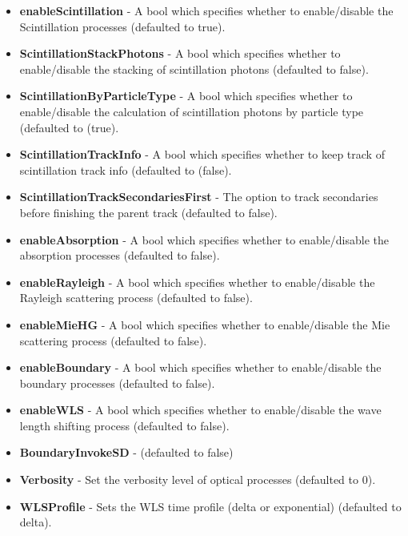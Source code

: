 \documentclass[8pt]{refart}
\begin{document}
\begin{itemize}
    \item \textbf{enableScintillation} - A {\color{magenta}bool} which specifies whether to enable/disable the Scintillation processes (defaulted to {\color{red}true}).
    \item \textbf{ScintillationStackPhotons} - A {\color{magenta}bool} which specifies whether to enable/disable the stacking of scintillation photons (defaulted to {\color{red}false}).
    \item \textbf{ScintillationByParticleType} - A {\color{magenta}bool} which specifies whether to enable/disable the calculation of scintillation photons by particle type (defaulted to ({\color{red}true}).
    \item \textbf{ScintillationTrackInfo} - A {\color{magenta}bool} which specifies whether to keep track of scintillation track info (defaulted to ({\color{red}false}).
    \item \textbf{ScintillationTrackSecondariesFirst} - The option to track secondaries before finishing the parent track (defaulted to {\color{red}false}).
    \item \textbf{enableAbsorption} - A {\color{magenta}bool} which specifies whether to enable/disable the absorption processes (defaulted to {\color{red}false}).
    \item \textbf{enableRayleigh} - A {\color{magenta}bool} which specifies whether to enable/disable the Rayleigh scattering process (defaulted to {\color{red}false}).
    \item \textbf{enableMieHG} - A {\color{magenta}bool} which specifies whether to enable/disable the Mie scattering process (defaulted to {\color{red}false}).
    \item \textbf{enableBoundary} - A {\color{magenta}bool} which specifies whether to enable/disable the boundary processes (defaulted to {\color{red}false}).
    \item \textbf{enableWLS} - A {\color{magenta}bool} which specifies whether to enable/disable the wave length shifting process (defaulted to {\color{red}false}).
    \item \textbf{BoundaryInvokeSD} -  (defaulted to {\color{red}false})
    \item \textbf{Verbosity} - Set the verbosity level of optical processes  (defaulted to {\color{red}0}).
    \item \textbf{WLSProfile} - Sets the WLS time profile (delta or exponential) (defaulted to {\color{red}delta}).
\end{itemize}
\end{document}

